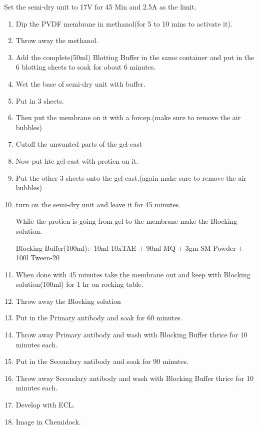 \documentclass[11pt,twoside,a4paper]{article}
\begin{document}
Set the semi-dry unit to 17V for 45 Min and 2.5A as the limit.
\begin{enumerate}
	\item Dip the PVDF membrane in methanol(for 5 to 10 mins to activate it).
	\item Throw away the methanol.
	\item Add the complete(50ml) Blotting Buffer in the same container and put in the 6 blotting sheets to soak for about 6 minutes.
	\item Wet the base of semi-dry unit with buffer.
	\item Put in 3 sheets.
	\item Then put the membrane on it with a forcep.(make sure to remove the air bubbles)
	\item Cutoff the unwanted parts of the gel-cast
	\item Now put hte gel-cast with protien on it.
	\item Put the other 3 sheets onto the gel-cast.(again make sure to remove the air bubbles)
	\item turn on the semi-dry unit and leave it for 45 minutes.

		While the protien is going from gel to the membrane make the Blocking solution.

		Blocking Buffer(100ml):- 10ml 10xTAE + 90ml MQ + 3gm SM Powder + 100\textmu{}l Tween-20
	\item When done with 45 minutes take the membrane out and keep with Blocking solution(100ml) for 1 hr on rocking table.
	\item Throw away the Blocking solution
	\item Put in the Primary antibody and soak for 60 minutes.
	\item Throw away Primary antibody and wash with Blocking Buffer thrice for 10 minutes each.
	\item Put in the Secondary antibody and soak for 90 minutes.
	\item Throw away Secondary antibody and wash with Blocking Buffer thrice for 10 minutes each.
	\item Develop with ECL.
	\item Image in Chemidock.
\end{enumerate}
\end{document}
